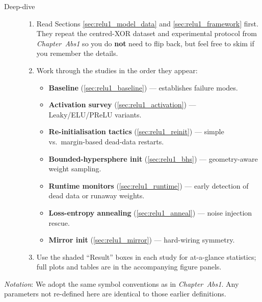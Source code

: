 \begin{description}
  \item[Deep-dive]
        \begin{enumerate}
          \item Read Sections \ref{sec:relu1_model_data} and \ref{sec:relu1_framework} first.  
                They repeat the centred-XOR dataset and experimental protocol from \emph{Chapter~Abs1} so you do \textbf{not} need to flip back, but feel free to skim if you remember the details.
          \item Work through the studies in the order they appear:
                \begin{itemize}
                    \item \textbf{Baseline} (\ref{sec:relu1_baseline})  
                          — establishes failure modes.
                    \item \textbf{Activation survey} (\ref{sec:relu1_activation})  
                          — Leaky/ELU/PReLU variants.
                    \item \textbf{Re-initialisation tactics} (\ref{sec:relu1_reinit})  
                          — simple vs.\ margin-based dead-data restarts.
                    \item \textbf{Bounded-hypersphere init} (\ref{sec:relu1_bhs})  
                          — geometry-aware weight sampling.
                    \item \textbf{Runtime monitors} (\ref{sec:relu1_runtime})  
                          — early detection of dead data or runaway weights.
                    \item \textbf{Loss-entropy annealing} (\ref{sec:relu1_anneal})  
                          — noise injection rescue.
                    \item \textbf{Mirror init} (\ref{sec:relu1_mirror})  
                          — hard-wiring symmetry.
                \end{itemize}
          \item Use the shaded “Result” boxes in each study for at-a-glance statistics; full plots and tables are in the accompanying figure panels.
        \end{enumerate}
\end{description}

\medskip\noindent
\textit{Notation}: We adopt the same symbol conventions as in \emph{Chapter~Abs1}.  Any parameters not re-defined here are identical to those earlier definitions.
